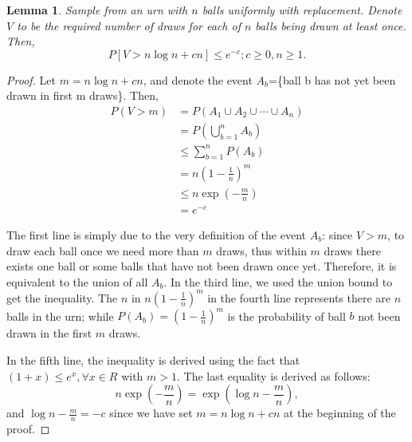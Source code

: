 \documentclass[12pt]{article}
\theoremstyle{plain}
\newtheorem{lemma}{Lemma}
\theoremstyle{definition}
\theoremstyle{remark}
\begin{document}
\begin{lemma}\cite[Lemma~2 on \pno~337]{1.1}
Sample from an urn with $n$ balls uniformly with replacement. Denote $V$ to be the required number of draws for each of $n$ balls being drawn at least once. Then,
$$P[V>n\log n+cn]\leq e^{-c};c\geq0,n\geq1.$$
\end{lemma} 

\begin{proof}
Let $m=n\log n+cn$, and denote the event $A_b$=\{ball b has not yet been drawn in first m draws\}. Then, 
\begin{equation*}
\begin{split}
    P(V>m)&=P(A_1\cup A_2\cup \cdots \cup A_n)\\
    &=P(\bigcup_{b=1}^{n}A_b)\\
    &\leq \sum_{b=1}^{n}P(A_b)\\
    &=n(1-\frac{1}{n})^m\\
    &\leq n\exp{(-\frac{m}{n})}\\
    &=e^{-c}
\end{split}
\end{equation*}

The first line is simply due to the very definition of the event $A_b$: since $V>m$, to draw each ball once we need more than $m$ draws, thus within $m$ draws there exists one ball or some balls that have not been drawn once yet. Therefore, it is equivalent to the union of all $A_b$. In the third line, we used the union bound to get the inequality. The $n$ in $n(1-\frac{1}{n})^m$ in the fourth line represents there are $n$ balls in the urn; while $P(A_b)=(1-\frac{1}{n})^m$ is the probability of ball $b$ not been drawn in the first $m$ draws.

In the fifth line, the inequality is derived using the fact that $(1+x)\leq e^x, \forall x \in R$ with $m>1$. The last equality is derived as follows:\[
n\exp{(-\frac{m}{n})}=\exp{(\log n-\frac{m}{n})},
\]
and $\log n-\frac{m}{n}=-c$ since we have set $m=n\log n+cn$ at the beginning of the proof.
\end{proof}
\end{document}
